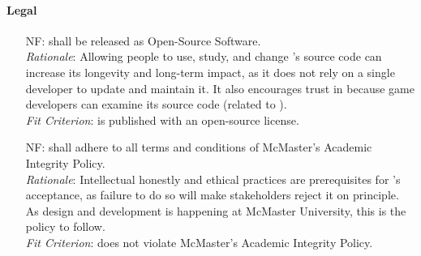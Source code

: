 \paragraph{Legal}
\noindent \begin{itemize}[wide=0pt, leftmargin=*]

    \item[NF\refstepcounter{nfnum}\thenfnum \label{N_OSS}:]  \progname{} shall
    be released as Open-Source Software. \vspace*{1mm}\\
    \textit{Rationale}: Allowing people to use, study, and change \progname{}'s
    source code can increase its longevity and long-term impact, as it does not
    rely on a single developer to update and maintain it. It also encourages
    trust in \progname{} because game developers can examine its source code
    (related to ). \vspace*{1mm}\\
    \textit{Fit Criterion}: \progname{} is published with an open-source
    license.

    \item[NF\refstepcounter{nfnum}\thenfnum \label{N_AcademicIntegrity}:]
    \progname{} shall adhere to all terms and conditions of McMaster's
    Academic Integrity Policy. \vspace*{1mm}\\
    \textit{Rationale}: Intellectual honestly and ethical practices are
    prerequisites for \progname{}'s acceptance, as failure to do so will make
    stakeholders reject it on principle. As \progname{} design and development
    is happening at McMaster University, this is the policy to follow.
    \vspace*{1mm}\\
    \textit{Fit Criterion}: \progname{} does not violate McMaster's Academic
    Integrity Policy.

\end{itemize}